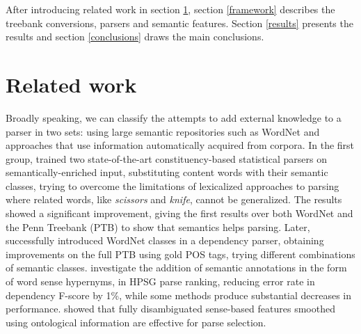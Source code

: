 \documentclass[11pt]{article}
\begin{document}
After introducing related work in section \ref{related}, section \ref{framework}
 describes the treebank conversions, parsers and semantic features. Section \ref{results} presents
the results and section \ref{conclusions} draws the main conclusions.

\section{Related work}\label{related}
Broadly speaking, we can classify the attempts to add external knowledge to a parser in two sets: using large semantic repositories such as WordNet and approaches that use information automatically acquired from corpora. 
In the first group,  trained two state-of-the-art constituency-based statistical parsers \cite{Charniak:2000:MP:974305.974323,DBLP:journals/coling/Bikel04} on semantically-enriched input, substituting content words with their semantic 
classes, trying to overcome the limitations of lexicalized approaches to parsing \cite{Collins:2003:HSM:1105703.1105706} where related words, like \emph{scissors} and \emph{knife}, cannot be generalized.
The results showed a signiﬁcant improvement, giving the first results over both WordNet and the Penn Treebank (PTB) to show that semantics helps parsing. Later,  successfully introduced WordNet classes in a dependency parser, obtaining improvements on the full PTB using gold POS tags, trying different combinations of   semantic classes. 
 investigate the addition of semantic
annotations in the form of word sense hypernyms,
 in HPSG parse ranking,
reducing error rate in dependency F-score
by 1\%, while some methods
produce substantial decreases in performance.
showed that fully disambiguated sense-based features smoothed
using ontological information are effective for parse selection. 
\end{document}
